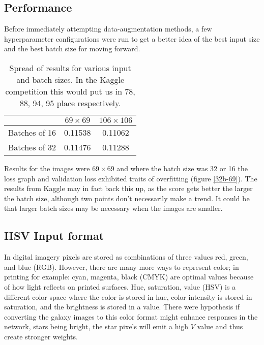 \subsection{Performance}

Before immediately attempting data-augmentation methods, a few hyperparameter configurations were run to get a better idea of the best input size and the best batch size for moving forward.

\begin{table}[]
    \centering
    \begin{tabular}{|r|c|c|}
        \hline
                      & $69 \times 69$ & $106 \times 106$ \\ \hline
        Batches of 16 & 0.11538 & 0.11062 \\ \hline
        Batches of 32 & 0.11476 & 0.11288 \\ \hline
    \end{tabular}
    \caption{Spread of results for various input and batch sizes. In the Kaggle competition this would put us in 78, 88, 94, 95 place respectively.}
    \label{tab:results1}
\end{table}

Results for the images were $69 \times 69$ and where the batch size was 32 or 16 the loss graph and validation loss exhibited traits of overfitting (figure \ref{32b-69}). The results from Kaggle may in fact back this up, as the score gets better the larger the batch size, although two points don't necessarily make a trend. It could be that larger batch sizes may be necessary when the images are smaller.




\subsection{HSV Input format}

In digital imagery pixels are stored as combinations of three values red, green, and blue (RGB). However, there are many more ways to represent color; in printing for example: cyan, magenta, black (CMYK) are optimal values because of how light reflects on printed surfaces. Hue, saturation, value (HSV) is a different color space where the color is stored in hue, color intensity is stored in saturation, and the brightness is stored in a value. There were hypothesis if converting the galaxy images to this color format might enhance responses in the network, stars being bright, the star pixels will emit a high $V$ value and thus create stronger weights.

